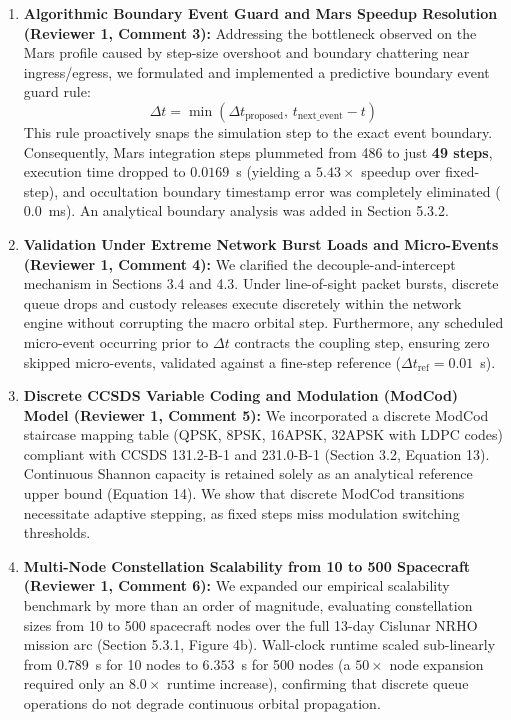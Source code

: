 \documentclass[10pt]{article}
\begin{document}
\begin{enumerate}[leftmargin=1.8em, itemsep=2.5pt, topsep=1pt, parsep=0pt]
  \item \textbf{Algorithmic Boundary Event Guard and Mars Speedup Resolution (Reviewer 1, Comment 3):}
  Addressing the bottleneck observed on the Mars profile caused by step-size overshoot and boundary chattering near ingress/egress, we formulated and implemented a predictive boundary event guard rule:
  \begin{equation*}
    \Delta t = \min(\Delta t_{\text{proposed}},\, t_{\text{next\_event}} - t)
  \end{equation*}
  This rule proactively snaps the simulation step to the exact event boundary. Consequently, Mars integration steps plummeted from 486 to just \textbf{49 steps}, execution time dropped to $0.0169$~s (yielding a \textbf{$5.43\times$} speedup over fixed-step), and occultation boundary timestamp error was completely eliminated ($0.0$~ms). An analytical boundary analysis was added in Section 5.3.2.

  \item \textbf{Validation Under Extreme Network Burst Loads and Micro-Events (Reviewer 1, Comment 4):}
  We clarified the decouple-and-intercept mechanism in Sections 3.4 and 4.3. Under line-of-sight packet bursts, discrete queue drops and custody releases execute discretely within the network engine without corrupting the macro orbital step. Furthermore, any scheduled micro-event occurring prior to $\Delta t$ contracts the coupling step, ensuring zero skipped micro-events, validated against a fine-step reference ($\Delta t_{\text{ref}} = 0.01$~s).

  \item \textbf{Discrete CCSDS Variable Coding and Modulation (ModCod) Model (Reviewer 1, Comment 5):}
  We incorporated a discrete ModCod staircase mapping table (QPSK, 8PSK, 16APSK, 32APSK with LDPC codes) compliant with CCSDS 131.2-B-1 and 231.0-B-1 (Section 3.2, Equation 13). Continuous Shannon capacity is retained solely as an analytical reference upper bound (Equation 14). We show that discrete ModCod transitions necessitate adaptive stepping, as fixed steps miss modulation switching thresholds.

  \item \textbf{Multi-Node Constellation Scalability from 10 to 500 Spacecraft (Reviewer 1, Comment 6):}
  We expanded our empirical scalability benchmark by more than an order of magnitude, evaluating constellation sizes from 10 to 500 spacecraft nodes over the full 13-day Cislunar NRHO mission arc (Section 5.3.1, Figure 4b). Wall-clock runtime scaled sub-linearly from $0.789$~s for 10 nodes to $6.353$~s for 500 nodes (a $50\times$ node expansion required only an $8.0\times$ runtime increase), confirming that discrete queue operations do not degrade continuous orbital propagation.


\end{enumerate}
\end{document}
